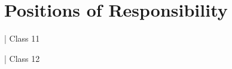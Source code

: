 \documentclass[]{deedy-resume-openfont}
\begin{document}
\sectionsep

%
%

\section{Positions of Responsibility}
\vspace{\topsep} %
\begin{large}
\begin{tightemize}
\item {} | Class 11
\item {} | Class 12
\end{tightemize}
\end{large}
\sectionsep
\end{document}
